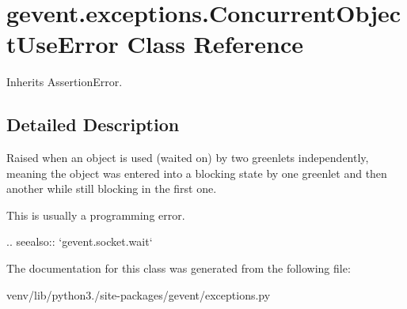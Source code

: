 \hypertarget{classgevent_1_1exceptions_1_1_concurrent_object_use_error}{}\section{gevent.\+exceptions.\+Concurrent\+Object\+Use\+Error Class Reference}
\label{classgevent_1_1exceptions_1_1_concurrent_object_use_error}


Inherits Assertion\+Error.



\subsection{Detailed Description}
\begin{DoxyVerb}Raised when an object is used (waited on) by two greenlets
independently, meaning the object was entered into a blocking
state by one greenlet and then another while still blocking in the
first one.

This is usually a programming error.

.. seealso:: `gevent.socket.wait`
\end{DoxyVerb}
 

The documentation for this class was generated from the following file\+:\begin{DoxyCompactItemize}
\item 
venv/lib/python3./site-\/packages/gevent/exceptions.\+py\end{DoxyCompactItemize}
